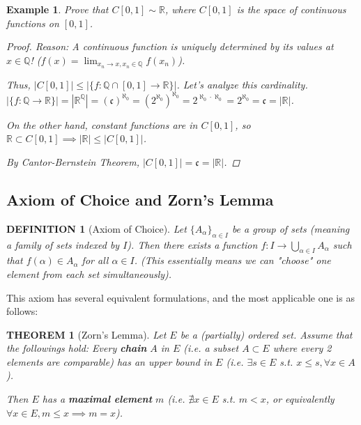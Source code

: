 \documentclass[12pt]{article}
\theoremstyle{blueplain}
\newtheorem{theorem}{THEOREM}[section]
\theoremstyle{bluedef}
\newtheorem{definition}{DEFINITION}[section]
\theoremstyle{blueremark}
\newtheorem{example}{Example}[section]
\newcommand{\R}{\mathbb{R}}
\newcommand{\Q}{\mathbb{Q}}
\numberwithin{equation}{section}
\begin{document}
      \begin{example}
        Prove that $C[0,1] \sim \R$, where $C[0,1]$ is the space of continuous functions on $[0,1]$.
        \begin{proof}
          Reason: A continuous function is uniquely determined by its values at $x \in \Q$!
          ($f(x) = \lim_{x_n \to x, x_n \in \Q} f(x_n)$).

          Thus, $|C[0,1]| \leq |\{f: \Q \cap [0,1] \to \R\}|$.
          Let's analyze this cardinality.
          $|\{f: \Q \to \R\}| = |\R^\Q| = (\mathfrak{c})^{\aleph_0} = (2^{\aleph_0})^{\aleph_0} = 2^{\aleph_0 \cdot \aleph_0} = 2^{\aleph_0} = \mathfrak{c} = |\R|$.

          On the other hand, constant functions are in $C[0,1]$, so $\R \subset C[0,1] \implies |\R| \leq |C[0,1]|$.

          By Cantor-Bernstein Theorem, $|C[0,1]| = \mathfrak{c} = |\R|$.
        \end{proof}
      \end{example}

      \clearpage

      \subsection{Axiom of Choice and Zorn's Lemma}

      \begin{definition}[Axiom of Choice]
        Let $\{A_\alpha\}_{\alpha \in I}$ be a group of sets (meaning a family of sets indexed by $I$).
        Then there exists a function $f: I \to \bigcup_{\alpha \in I} A_\alpha$ such that $f(\alpha) \in A_\alpha$ for all $\alpha \in I$.
        (This essentially means we can "choose" one element from each set simultaneously).
      \end{definition}

      This axiom has several equivalent formulations, and the most applicable one is as follows:

      \begin{theorem}[Zorn's Lemma]
        Let $E$ be a (partially) ordered set. Assume that the followings hold:
        Every \textbf{chain} $A$ in $E$ (i.e. a subset $A \subset E$ where every 2 elements are comparable) has an upper bound in $E$ (i.e. $\exists s \in E$ s.t. $x \leq s, \forall x \in A$).

        Then $E$ has a \textbf{maximal element} $m$ (i.e. $\nexists x \in E$ s.t. $m < x$, or equivalently $\forall x \in E, m \leq x \implies m = x$).
      \end{theorem}
\end{document}
